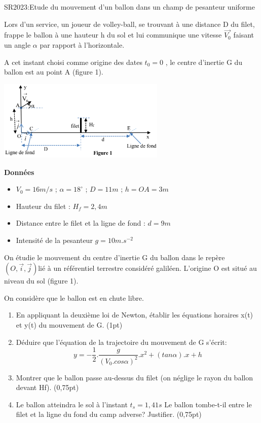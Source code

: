 \documentclass[12pt]{article}
\begin{document}
 \begin{Box2}{SR2023:Etude du mouvement d’un ballon dans un champ de pesanteur uniforme}

   Lors d’un service, un joueur de volley-ball, se trouvant à une distance D du
filet, frappe le ballon à une hauteur h du sol et lui communique une vitesse $\vec{V_0}$
faisant un angle $\alpha$ par rapport à l’horizontale.

   A cet instant choisi comme origine des dates $t_0 = 0$
, le centre d’inertie G du ballon est au point A (figure 1).
  
   \begin{center}
	\includegraphics[width=0.6\textwidth]{./img/chute_libreSx.png}
  \end{center}
   \textbf{Données}

 \begin{itemize}
   \item $V_0 = 16 m/s$ ; $\alpha = 18^{\circ}$ ; $D=11m$ ; $h = OA= 3m$
   \item Hauteur du filet : $H_f = 2,4m$
   \item Distance entre le filet et la ligne de fond : $d =9m$
   \item Intensité de la pesanteur $g = 10 m.s^{-2}$
 \end{itemize}
   On étudie le mouvement du centre d’inertie G du ballon dans le repère $(O,\vec{i} , \vec{j} )$lié à un référentiel terrestre
considéré galiléen. L’origine O est situé au niveau du sol (figure 1).

On considère que le ballon est en chute libre.

\begin{enumerate}
  \item En appliquant la deuxième loi de Newton, établir les équations horaires x(t) et y(t) du mouvement de G. (1pt)
  \item Déduire que l’équation de la trajectoire du mouvement de G s’écrit: $$y = - \frac{1}{2}. \frac{g}{(V_0.cos\alpha)^2}.x^2 + (tan\alpha).x + h$$
  \item Montrer que le ballon passe au-dessus du filet (on néglige le rayon du ballon devant Hf). (0,75pt)
  \item Le ballon atteindra le sol à l’instant $t_s=1,41s$
    Le ballon tombe-t-il entre le filet et la ligne du fond du camp adverse? Justifier. (0,75pt)
\end{enumerate}


 \end{Box2}
\end{document}
